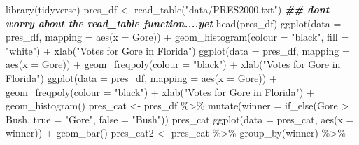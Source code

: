 \documentclass[
]{book}
\newenvironment{Shaded}{\begin{snugshade}}{\end{snugshade}}
\newcommand{\AttributeTok}[1]{\textcolor[rgb]{0.77,0.63,0.00}{#1}}
\newcommand{\DocumentationTok}[1]{\textcolor[rgb]{0.56,0.35,0.01}{\textbf{\textit{#1}}}}
\newcommand{\FunctionTok}[1]{\textcolor[rgb]{0.00,0.00,0.00}{#1}}
\newcommand{\NormalTok}[1]{#1}
\newcommand{\OtherTok}[1]{\textcolor[rgb]{0.56,0.35,0.01}{#1}}
\newcommand{\SpecialCharTok}[1]{\textcolor[rgb]{0.00,0.00,0.00}{#1}}
\newcommand{\StringTok}[1]{\textcolor[rgb]{0.31,0.60,0.02}{#1}}
\begin{document}
\begin{Shaded}
\begin{Highlighting}[]
\FunctionTok{library}\NormalTok{(tidyverse)}
\NormalTok{pres\_df }\OtherTok{\textless{}{-}} \FunctionTok{read\_table}\NormalTok{(}\StringTok{"data/PRES2000.txt"}\NormalTok{) }
\DocumentationTok{\#\# don\textquotesingle{}t worry about the \textasciigrave{}read\_table\textasciigrave{} function....yet}
\FunctionTok{head}\NormalTok{(pres\_df)}
\FunctionTok{ggplot}\NormalTok{(}\AttributeTok{data =}\NormalTok{ pres\_df, }\AttributeTok{mapping =} \FunctionTok{aes}\NormalTok{(}\AttributeTok{x =}\NormalTok{ Gore)) }\SpecialCharTok{+}
  \FunctionTok{geom\_histogram}\NormalTok{(}\AttributeTok{colour =} \StringTok{"black"}\NormalTok{, }\AttributeTok{fill =} \StringTok{"white"}\NormalTok{) }\SpecialCharTok{+}
  \FunctionTok{xlab}\NormalTok{(}\StringTok{"Votes for Gore in Florida"}\NormalTok{)}
\FunctionTok{ggplot}\NormalTok{(}\AttributeTok{data =}\NormalTok{ pres\_df, }\AttributeTok{mapping =} \FunctionTok{aes}\NormalTok{(}\AttributeTok{x =}\NormalTok{ Gore)) }\SpecialCharTok{+}
  \FunctionTok{geom\_freqpoly}\NormalTok{(}\AttributeTok{colour =} \StringTok{"black"}\NormalTok{) }\SpecialCharTok{+}
  \FunctionTok{xlab}\NormalTok{(}\StringTok{"Votes for Gore in Florida"}\NormalTok{) }
\FunctionTok{ggplot}\NormalTok{(}\AttributeTok{data =}\NormalTok{ pres\_df, }\AttributeTok{mapping =} \FunctionTok{aes}\NormalTok{(}\AttributeTok{x =}\NormalTok{ Gore)) }\SpecialCharTok{+}
  \FunctionTok{geom\_freqpoly}\NormalTok{(}\AttributeTok{colour =} \StringTok{"black"}\NormalTok{) }\SpecialCharTok{+}
  \FunctionTok{xlab}\NormalTok{(}\StringTok{"Votes for Gore in Florida"}\NormalTok{) }\SpecialCharTok{+}
  \FunctionTok{geom\_histogram}\NormalTok{() }
\NormalTok{pres\_cat }\OtherTok{\textless{}{-}}\NormalTok{ pres\_df }\SpecialCharTok{\%\textgreater{}\%} \FunctionTok{mutate}\NormalTok{(}\AttributeTok{winner =} \FunctionTok{if\_else}\NormalTok{(Gore }\SpecialCharTok{\textgreater{}}\NormalTok{ Bush,}
                                                \AttributeTok{true =} \StringTok{"Gore"}\NormalTok{,}
                                                \AttributeTok{false =} \StringTok{"Bush"}\NormalTok{))}
\NormalTok{pres\_cat}
\FunctionTok{ggplot}\NormalTok{(}\AttributeTok{data =}\NormalTok{ pres\_cat, }\FunctionTok{aes}\NormalTok{(}\AttributeTok{x =}\NormalTok{ winner)) }\SpecialCharTok{+}
  \FunctionTok{geom\_bar}\NormalTok{()}
\NormalTok{pres\_cat2 }\OtherTok{\textless{}{-}}\NormalTok{ pres\_cat }\SpecialCharTok{\%\textgreater{}\%} \FunctionTok{group\_by}\NormalTok{(winner) }\SpecialCharTok{\%\textgreater{}\%}

\end{Highlighting}
\end{Shaded}
\end{document}
